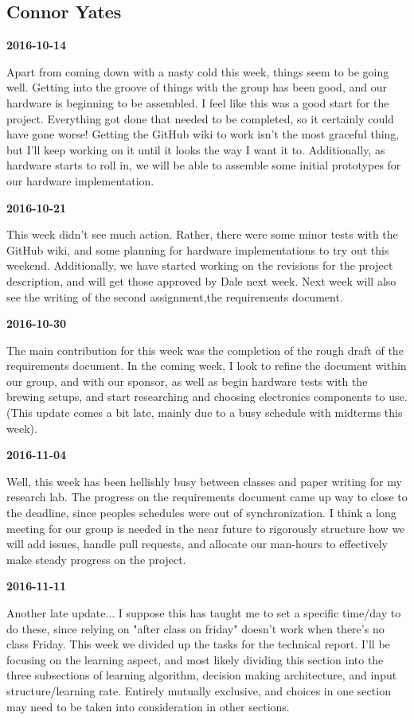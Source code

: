 \subsection{Connor Yates}

\textbf{2016-10-14}

Apart from coming down with a nasty cold this week, things seem to be going well. Getting into the groove of things with the group has been good, and our hardware is beginning to be assembled. I feel like this was a good start for the project. Everything got done that needed to be completed, so it certainly could have gone worse!
Getting the GitHub wiki to work isn't the most graceful thing, but I'll keep working on it until it looks the way I want it to. Additionally, as hardware starts to roll in, we will be able to assemble some initial prototypes for our hardware implementation.

\textbf{2016-10-21}

This week didn't see much action. Rather, there were some minor tests with the GitHub wiki, and some planning for hardware implementations to try out this weekend. Additionally, we have started working on the revisions for the project description, and will get those approved by Dale next week. Next week will also see the writing of the second assignment,the requirements document.

\textbf{2016-10-30}

The main contribution for this week was the completion of the rough draft of the requirements document.
In the coming week, I look to refine the document within our group, and with our sponsor, as well as begin hardware tests with the brewing setups, and start researching and choosing electronics components to use.
(This update comes a bit late, mainly due to a busy schedule with midterms this week).

\textbf{2016-11-04}

Well, this week has been hellishly busy between classes and paper writing for my research lab.
The progress on the requirements document came up way to close to the deadline, since peoples schedules were out of synchronization.
I think a long meeting for our group is needed in the near future to rigorously structure how we will add issues, handle pull requests, and allocate our man-hours to effectively make steady progress on the project.

\textbf{2016-11-11}

Another late update...
I suppose this has taught me to set a specific time/day to do these, since relying on "after class on friday" doesn't work when there's no class Friday.
This week we divided up the tasks for the technical report. I'll be focusing on the learning aspect, and most likely dividing this section into the three subsections of learning algorithm, decision making architecture, and input structure/learning rate.
Entirely mutually exclusive, and choices in one section may need to be taken into consideration in other sections.

